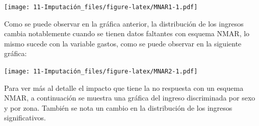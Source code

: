 \documentclass[
  12pt,
]{book}
\newenvironment{Shaded}{\begin{snugshade}}{\end{snugshade}}
\newcommand{\AttributeTok}[1]{\textcolor[rgb]{0.77,0.63,0.00}{#1}}
\newcommand{\FloatTok}[1]{\textcolor[rgb]{0.00,0.00,0.81}{#1}}
\newcommand{\FunctionTok}[1]{\textcolor[rgb]{0.00,0.00,0.00}{#1}}
\newcommand{\NormalTok}[1]{#1}
\newcommand{\OtherTok}[1]{\textcolor[rgb]{0.56,0.35,0.01}{#1}}
\newcommand{\SpecialCharTok}[1]{\textcolor[rgb]{0.00,0.00,0.00}{#1}}
\newcommand{\StringTok}[1]{\textcolor[rgb]{0.31,0.60,0.02}{#1}}
\begin{document}
\texttt{[image: 11-Imputación\_files/figure-latex/MNAR1-1.pdf]}

Como se puede observar en la gráfica anterior, la distribución de los ingresos cambia notablemente cuando se tienen datos faltantes con esquema NMAR, lo mismo sucede con la variable gastos, como se puede observar en la siguiente gráfica:

\begin{Shaded}
\end{Shaded}

\texttt{[image: 11-Imputación\_files/figure-latex/MNAR2-1.pdf]}

Para ver más al detalle el impacto que tiene la no respuesta con un esquema NMAR, a continuación se muestra una gráfica del ingreso discriminada por sexo y por zona. También se nota un cambio en la distribución de los ingresos significativos.

\begin{Shaded}
\end{Shaded}
\end{document}
